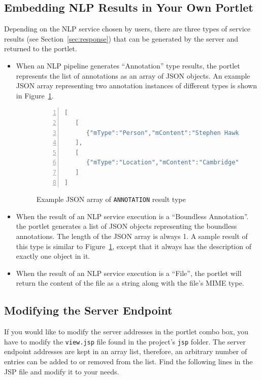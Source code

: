 \subsection{Embedding NLP Results in Your Own Portlet}
Depending on the NLP service chosen by users, there are three types of service results  (see Section~\ref{sec:response}) that can be generated by the \sa server and returned to the portlet.

\begin{itemize}
\item When an NLP pipeline generates ``Annotation'' type results, the \sa portlet represents the list of annotations as an array of JSON objects. An example JSON array representing two annotation instances of different types is shown in Figure~\ref{list:json_annot}.
\begin{figure}[h!]
\centering
\begin{lstlisting}[language=Java,numbers=left,xleftmargin=4mm,columns=flexible]
[
   [
      {"mType":"Person","mContent":"Stephen Hawking","mFeatures":{"gender":"male"},"mStart":0,"mEnd":15},
   ],
   [
      {"mType":"Location","mContent":"Cambridge","mFeatures":{"locType":"city"},"mStart":240,"mEnd":249},
   ]
]
\end{lstlisting}
\caption{Example JSON array of \texttt{ANNOTATION} result type}
\label{list:json_annot}
\end{figure}

\item When the result of an NLP service execution is a ``Boundless Annotation''. the \sa portlet generates a list of JSON objects representing the boundless annotations. The length of the JSON array is always 1. A sample result of this type is similar to Figure~\ref{list:json_annot}, except that it always has the description of exactly one object in it.
\item When the result of an NLP service execution is a ``File'', the \sa portlet will return the content of the file as a string along with the file's MIME type.
\end{itemize}

\subsection{Modifying the \sa Server Endpoint}
If you would like to modify the \sa server addresses in the portlet combo box, you have to modify the \texttt{view.jsp} file found in the project's \texttt{jsp} folder. The server endpoint addresses are kept in an array list, therefore, an arbitrary number of entries can be added to or removed from the list. Find the following lines in the JSP file and modify it to your needs.

